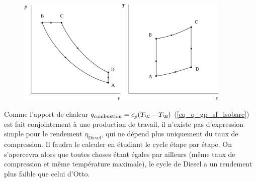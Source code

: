 		\begin{figure}
			\begin{center}
				\includegraphics[width=0.45\textwidth]{images/pv_gp_diesel.png}
				\includegraphics[width=0.45\textwidth]{images/ts_gp_diesel.png}
			\end{center}
			\label{fig_cycle_diesel}
		\end{figure}

		Comme l’apport de chaleur $q_\text{combustion} = c_p (T_\C - T_\B)$ (\ref{eq_q_gp_sf_isobare}) est fait conjointement à une production de travail, il n’existe pas d’expression simple pour le rendement $\eta_\text{Diesel}$, qui ne dépend plus uniquement du taux de compression. Il faudra le calculer en étudiant le cycle étape par étape. On s’apercevra alors que toutes choses étant égales par ailleurs (même taux de compression et même température maximale), le cycle de Diesel a un rendement plus faible que celui d’Otto. 
		
